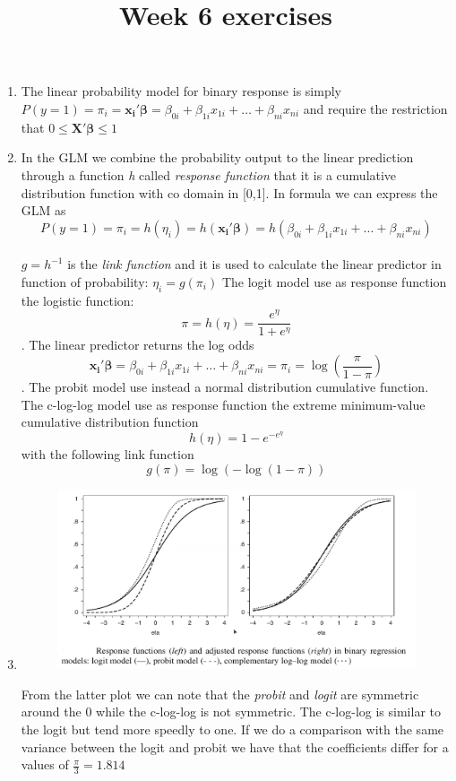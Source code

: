 \documentclass[10pt,a4paper]{article}
\title{Week 6 exercises}
\begin{document}
	\maketitle
	\begin{enumerate}
		\item The linear probability model for binary response is simply $ P(y = 1) =   \pi_i = \bm{x_i'\beta} = \beta_{0i} + 
		\beta_{1i} x_{1i}  + \dots + \beta_{ni} x_{ni}   $ and require the restriction that $ 0  \leq  \bm{X'\beta}  \leq 1 $ 
		\item In the GLM we combine the probability output to the linear prediction through a function \textit{h} called \textit{response function} that it is a cumulative distribution function with co domain in [0,1]. In formula we can express the GLM as $$ P(y = 1) =   \pi_i = h(\eta_i) = h(\mathbf{x_i'\beta}) = h(\beta_{0i} + 
		\beta_{1i} x_{1i}  + \dots + \beta_{ni} x_{ni})  $$\\$ g = h^{-1} $ is the \textit{link function} and it is used to calculate the linear predictor in function of probability: $ \eta_i = g(\pi_i) $ 
		The logit model use as response function the logistic function: $$ \pi = h(\eta) = \dfrac{e^\eta}{1 + e^\eta} $$. The linear predictor returns the log odds $$ \mathbf{x_i'\beta} = \beta_{0i} + 
		\beta_{1i} x_{1i}  + \dots + \beta_{ni} x_{ni} =  \pi_i = \log\left(\dfrac{\pi}{1 - \pi}\right)   $$.
		The probit model use instead a normal distribution cumulative function.
		The c-log-log model use as response function the extreme minimum-value cumulative
		distribution function
		$$ h(\eta) = 1 - e^{-e^\eta}$$ with the following link function $$ g(\pi) = \log(- \log( 1 - \pi )) $$
		\item 
		\begin{figure}[H]
			\centering
			\includegraphics[width=0.7\linewidth]{plot_comparison_response_functions}
			\label{fig:plotcomparisonresponsefunctions}
		\end{figure}
		From the latter plot we can note that the \textit{probit} and \textit{logit} are symmetric around the 0 while the c-log-log is not symmetric. The c-log-log is similar to the logit but tend more speedly to one. If we do a comparison with the same variance between the logit and probit we have that the coefficients differ for a values of $ \frac{\pi}{3} = 1.814 $

\end{enumerate}
\end{document}
